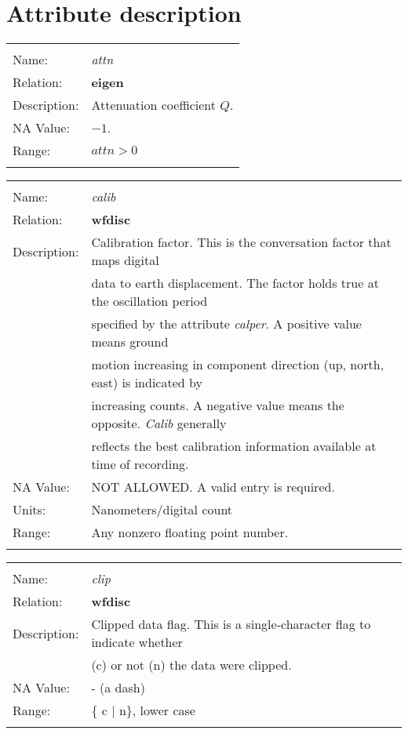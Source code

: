 \newpage

\section{Attribute description}

\begin{tabular*}{6.5 in}{ll} \hline
\\
Name: & {\it attn} \\
Relation: & {\bf eigen} \\
Description: & Attenuation coefficient $Q$. \\
NA Value: & $-1$. \\
Range: & $attn > 0$ \\
&\\
\end{tabular*}
\begin{tabular*}{6.5 in}{ll} \hline
\\
Name: & {\it calib} \\
Relation: & {\bf wfdisc} \\
Description: & Calibration factor. This is the conversation factor that maps digital \\
& data to earth displacement. The factor holds true at the oscillation period \\
& specified by the attribute {\it calper}. A positive value means ground \\
& motion increasing in component direction (up, north, east) is indicated by \\
& increasing counts. A negative value means the opposite. {\it Calib} generally \\
& reflects the best calibration information available at time of recording. \\
NA Value: & NOT ALLOWED. A valid entry is required. \\
Units: & Nanometers/digital count \\
Range: & Any nonzero floating point number. \\
& \\
\end{tabular*}
\begin{tabular*}{6.5 in}{ll} \hline
\\
Name: & {\it clip} \\
Relation: & {\bf wfdisc} \\
Description: & Clipped data flag. This is a single-character flag to indicate whether \\
& (c) or not (n) the data were clipped. \\
NA Value: & - (a dash) \\
Range: & \{ c $|$ n\}, lower case \\
&\\
\end{tabular*}
